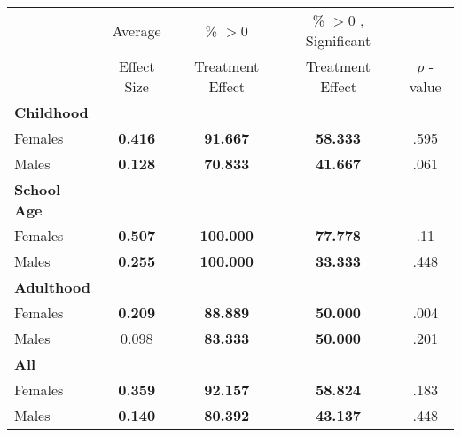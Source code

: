\begin{tabular}{l c c c c}
\toprule
 & Average & \% $ >0 $ & \% $ >0 $ , Significant & \citet{Rosenbaum_2005_Distribution_JRSS} \\
 & Effect Size & Treatment Effect & Treatment Effect & $ p $ -value \\
\midrule
\textbf{Childhood} & & & & \\
\quad Females &  \textbf{    0.416} & \textbf{   91.667} & \textbf{   58.333} & .595 \\
\quad Males &  \textbf{    0.128} & \textbf{   70.833} & \textbf{   41.667} & .061 \\
\midrule
\textbf{School Age} & & & & \\
\quad Females &  \textbf{    0.507} & \textbf{  100.000} & \textbf{   77.778} & .11 \\
\quad Males &  \textbf{    0.255} & \textbf{  100.000} & \textbf{   33.333} & .448 \\
\midrule
\textbf{Adulthood} & & & & \\
\quad Females &  \textbf{    0.209} & \textbf{   88.889} & \textbf{   50.000} & .004 \\
\quad Males &      0.098 & \textbf{   83.333} & \textbf{   50.000} & .201 \\
\midrule
\textbf{All} & & & & \\
\quad Females &  \textbf{    0.359} & \textbf{   92.157} & \textbf{   58.824} & .183 \\
\quad Males &  \textbf{    0.140} & \textbf{   80.392} & \textbf{   43.137} & .448 \\
\bottomrule
\end{tabular}
